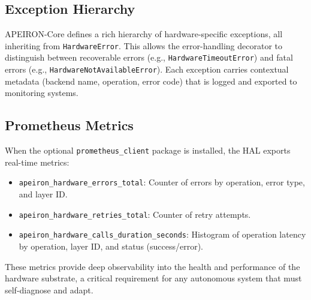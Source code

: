 \subsection{Exception Hierarchy}

APEIRON-Core defines a rich hierarchy of hardware-specific exceptions, all inheriting from \texttt{HardwareError}. This allows the error-handling decorator to distinguish between recoverable errors (e.g., \texttt{HardwareTimeoutError}) and fatal errors (e.g., \texttt{HardwareNotAvailableError}). Each exception carries contextual metadata (backend name, operation, error code) that is logged and exported to monitoring systems.

\subsection{Prometheus Metrics}

When the optional \texttt{prometheus\_client} package is installed, the HAL exports real-time metrics:

\begin{itemize}
    \item \texttt{apeiron\_hardware\_errors\_total}: Counter of errors by operation, error type, and layer ID.
    \item \texttt{apeiron\_hardware\_retries\_total}: Counter of retry attempts.
    \item \texttt{apeiron\_hardware\_calls\_duration\_seconds}: Histogram of operation latency by operation, layer ID, and status (success/error).
\end{itemize}

These metrics provide deep observability into the health and performance of the hardware substrate, a critical requirement for any autonomous system that must self-diagnose and adapt.